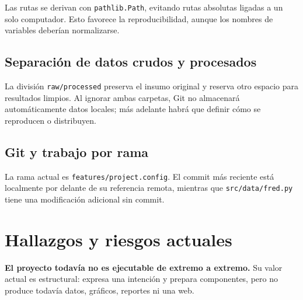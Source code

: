 \documentclass[11pt,a4paper]{article}
\newcommand{\code}[1]{\texttt{#1}}
\begin{document}
Las rutas se derivan con \code{pathlib.Path}, evitando rutas absolutas ligadas a un solo computador. Esto favorece la reproducibilidad, aunque los nombres de variables deberían normalizarse.

\subsection{Separación de datos crudos y procesados}

La división \code{raw/processed} preserva el insumo original y reserva otro espacio para resultados limpios. Al ignorar ambas carpetas, Git no almacenará automáticamente datos locales; más adelante habrá que definir cómo se reproducen o distribuyen.

\subsection{Git y trabajo por rama}

La rama actual es \code{features/project.config}. El commit más reciente está localmente por delante de su referencia remota, mientras que \code{src/data/fred.py} tiene una modificación adicional sin commit.

\section{Hallazgos y riesgos actuales}

\begin{warningbox}
\textbf{El proyecto todavía no es ejecutable de extremo a extremo.} Su valor actual es estructural: expresa una intención y prepara componentes, pero no produce todavía datos, gráficos, reportes ni una web.
\end{warningbox}
\end{document}
